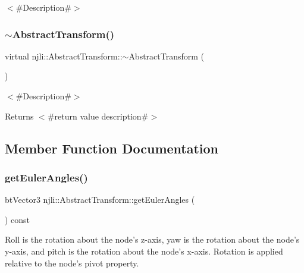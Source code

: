 $<$\#\+Description\#$>$ \mbox{\label{classnjli_1_1_abstract_transform_a0e9a40091685470285419f35c6c91bcc}} 
\subsubsection{\texorpdfstring{$\sim$\+Abstract\+Transform()}{~AbstractTransform()}}
{\footnotesize\ttfamily virtual njli\+::\+Abstract\+Transform\+::$\sim$\+Abstract\+Transform (\begin{DoxyParamCaption}{ }\end{DoxyParamCaption})\hspace{0.3cm}{\ttfamily [virtual]}}

$<$\#\+Description\#$>$

\begin{DoxyReturn}{Returns}
$<$\#return value description\#$>$ 
\end{DoxyReturn}


\subsection{Member Function Documentation}
\mbox{\label{classnjli_1_1_abstract_transform_a1a9cf70d9ae4b9405500be603e74b4e8}} 
\subsubsection{\texorpdfstring{get\+Euler\+Angles()}{getEulerAngles()}}
{\footnotesize\ttfamily bt\+Vector3 njli\+::\+Abstract\+Transform\+::get\+Euler\+Angles (\begin{DoxyParamCaption}{ }\end{DoxyParamCaption}) const}

Roll is the rotation about the node’s z-\/axis, yaw is the rotation about the node’s y-\/axis, and pitch is the rotation about the node’s x-\/axis. Rotation is applied relative to the node’s pivot property.

